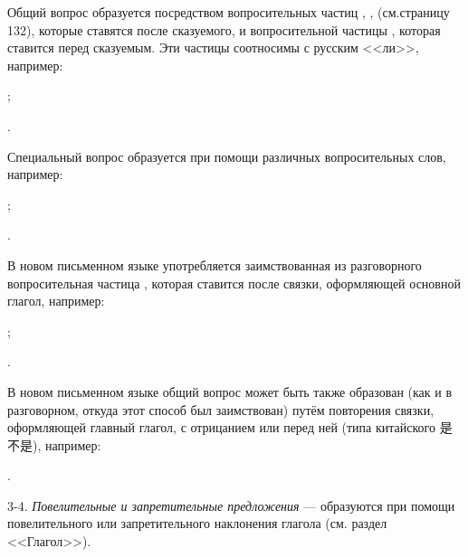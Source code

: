 Общий вопрос образуется посредством вопросительных частиц
, ,  (см.страницу 132), которые ставятся после сказуемого, и вопросительной частицы , которая ставится перед сказуемым. Эти частицы соотносимы с русским <<ли>>, например:
\begin{prfsample}
	\item {};
	\item {}.
\end{prfsample}

Специальный вопрос образуется при помощи различных вопросительных слов, например:	
\begin{prfsample}
	\item {};
	\item {}.
\end{prfsample}

В новом письменном языке употребляется заимствованная из разговорного вопросительная частица	, которая ставится после связки, оформляющей основной глагол, например:
\begin{prfsample}
	\item {};
	\item {}.
\end{prfsample}

В новом письменном языке общий вопрос может быть также образован (как и в разговорном, откуда этот способ был заимствован) путём повторения связки, оформляющей главный глагол, с отрицанием  или  перед ней (типа китайского {\chinfont 是不是}), например:
\begin{prfsample}
	\item {}.
\end{prfsample}

3-4. \emph{Повелительные и запретительные предложения} --- образуются при помощи повелительного или запретительного наклонения глагола (см. раздел <<Глагол>>).

